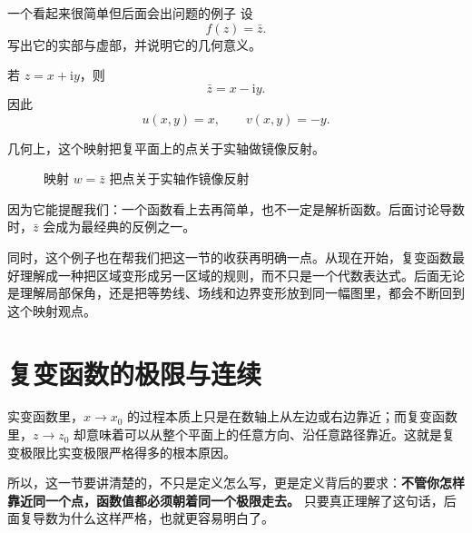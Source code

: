 \begin{lizi}{一个看起来很简单但后面会出问题的例子}{}
设
\[
    f(z)=\bar z.
\]
写出它的实部与虚部，并说明它的几何意义。

\begin{jie}
若 $z=x+\mathrm{i}y$，则
\[
    \bar z=x-\mathrm{i}y.
\]
因此
\[
    u(x,y)=x,\qquad v(x,y)=-y.
\]

几何上，这个映射把复平面上的点关于实轴做镜像反射。
\end{jie}
\end{lizi}

\begin{figure}[htbp]
\centering
{}
\caption{映射 $w=\bar z$ 把点关于实轴作镜像反射}
\label{fig:ch02-conjugation-reflection}
\end{figure}

\begin{tishi}
因为它能提醒我们：一个函数看上去再简单，也不一定是解析函数。后面讨论导数时，$\bar z$ 会成为最经典的反例之一。

同时，这个例子也在帮我们把这一节的收获再明确一点。从现在开始，复变函数最好理解成一种把区域变形成另一区域的规则，而不只是一个代数表达式。后面无论是理解局部保角，还是把等势线、场线和边界变形放到同一幅图里，都会不断回到这个映射观点。
\end{tishi}

\section{复变函数的极限与连续}

\begin{wulibj}[为什么复变极限更严格]
实变函数里，$x\to x_0$ 的过程本质上只是在数轴上从左边或右边靠近；而复变函数里，$z\to z_0$ 却意味着可以从整个平面上的任意方向、沿任意路径靠近。这就是复变极限比实变极限严格得多的根本原因。

所以，这一节要讲清楚的，不只是定义怎么写，更是定义背后的要求：\textbf{不管你怎样靠近同一个点，函数值都必须朝着同一个极限走去。} 只要真正理解了这句话，后面复导数为什么这样严格，也就更容易明白了。
\end{wulibj}

